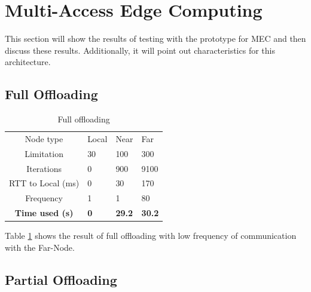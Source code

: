 

\section{Multi-Access Edge Computing} \label{section:MEC_evaluation}
This section will show the results of testing with the prototype for MEC and then discuss these results. Additionally, it will point out characteristics for this architecture.




\subsection{Full Offloading}

\begin{table}[h!]
    \centering
    \begin{tabular}[c]{c|p{2cm}p{2cm}p{2cm}}

        Node type & Local & Near & Far \\

        Limitation          & 30 & 100 & 300  \\

        Iterations          & 0 & 900 & 9100  \\

        RTT to Local (ms)   & 0 & 30 & 170 \\

        Frequency           & 1 & 1 & 80 \\

        \hline
        \textbf{Time used (s)}       & \textbf{0} & \textbf{29.2} & \textbf{30.2} \\

    \end{tabular}
    \caption{Full offloading}
    \label{tab:MEC_full_offloading_low_frequency}
\end{table}

Table \ref{tab:MEC_full_offloading_low_frequency} shows the result of full offloading with low frequency of communication with the Far-Node.






\subsection{Partial Offloading}



